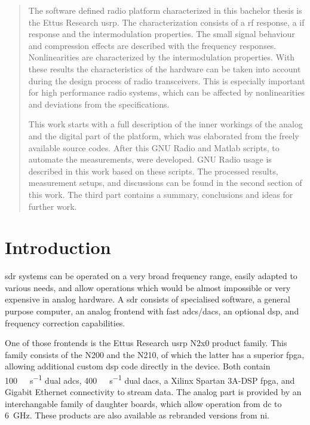 \documentclass[12pt,a4paper,parskip=full,abstracton]{scrartcl}
\begin{document}
\tableofcontents
\clearpage
\begin{abstract}
The software defined radio platform characterized in this bachelor thesis is the Ettus
Research \gls{usrp}. The characterization consists of a \gls{rf} response,
a \gls{if} response and the intermodulation properties. The small signal
behaviour and compression effects are described with the frequency responses. Nonlinearities
are characterized by the intermodulation properties. With these results the characteristics
of the hardware can be taken into account during the design process of radio transceivers.
This is especially important for high performance radio systems, which can be affected by
nonlinearities and deviations from the specifications.

This work starts with a full description of the inner workings of the analog and
the digital part of the platform, which was elaborated from the freely available
source codes. After this GNU Radio and Matlab scripts, to automate the measurements, were
developed. GNU Radio usage is described in this work based on these scripts. The
processed results, measurement setups, and discussions can be found in
the second section of this work. The third part contains a summary, conclusions and ideas for further work.

\end{abstract}
\clearpage
\section{Introduction}
\Gls{sdr} systems can be operated on a very broad frequency range,
easily adapted to various needs, and allow operations which would be almost
impossible or very expensive in analog hardware. A \gls{sdr} consists of specialised
software, a general purpose computer, an analog frontend with fast
\glspl{adc}/\glspl{dac}, an optional \gls{dsp}, and frequency correction capabilities.

One of those frontends is 
the Ettus Research \gls{usrp} N2x0 product family. This family consists of the N200 and
the N210, of which the latter has a superior \gls{fpga}, allowing additional custom \gls{dsp} code directly
in the device. Both contain \SI{100}{\mega\samples\per\second} dual \glspl{adc},
\SI{400}{\mega\samples\per\second} dual \glspl{dac}, a Xilinx Spartan
3A-DSP \gls{fpga}, and Gigabit Ethernet connectivity to stream data. The analog part is
provided by an interchangable family of daughter boards, which allow operation from
\gls{dc} to \SI{6}{\giga\hertz}\cite{ettus_n2x0}. These products are also available as rebranded
versions from \gls{ni}.
\end{document}
